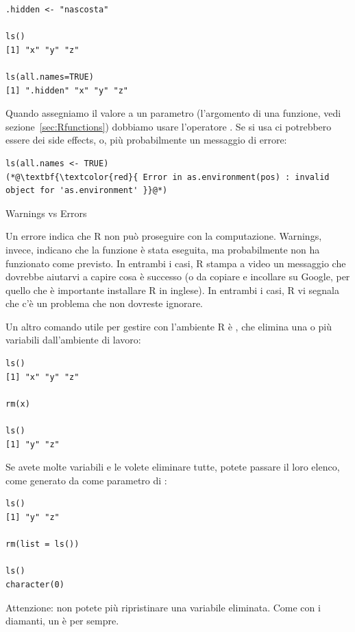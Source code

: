 \begin{lstlisting}[style=Rstyle]
.hidden <- "nascosta"

ls()
[1] "x" "y" "z"

ls(all.names=TRUE)
[1] ".hidden" "x" "y" "z"
\end{lstlisting}
%
Quando assegniamo il valore a un parametro (l'argomento di una funzione, vedi sezione~\ref{sec:Rfunctions}) dobbiamo usare l'operatore \lsin{=}. Se si usa \lsin{<-} ci potrebbero essere dei side effects, o, pi\`u probabilmente un messaggio di errore:

\begin{lstlisting}[style=Rstyle]
ls(all.names <- TRUE)
(*@\textbf{\textcolor{red}{ Error in as.environment(pos) : invalid object for 'as.environment' }}@*)
\end{lstlisting}

\begin{mybox}{Warnings vs Errors}
	
Un errore indica che R non pu\`o proseguire con la computazione. Warnings, invece, indicano che la funzione \`e stata eseguita, ma probabilmente non ha funzionato come previsto. In entrambi i casi, R stampa a video un messaggio che dovrebbe aiutarvi a capire cosa \`e successo (o da copiare e incollare su Google, per quello che \`e importante installare R in inglese). In entrambi i casi, R vi segnala che c'\`e un problema che non dovreste ignorare.

\end{mybox}


\noindent Un altro comando utile per gestire con l'ambiente R \`e , che elimina una o pi\`u variabili dall'ambiente di lavoro:

\begin{lstlisting}[style=Rstyle]
ls()
[1] "x" "y" "z"

rm(x)

ls()
[1] "y" "z"
\end{lstlisting}
%
Se avete molte variabili e le volete eliminare tutte, potete passare il loro elenco, come generato da  come parametro di :

\begin{lstlisting}[style=Rstyle]
ls()
[1] "y" "z"

rm(list = ls())

ls()
character(0)
\end{lstlisting}
%
Attenzione: non potete pi\`u ripristinare una variabile eliminata. Come con i diamanti, un  \`e per sempre.



